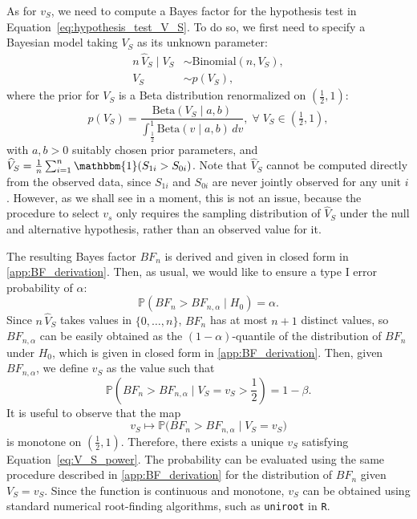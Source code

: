 \documentclass[referee,usenatbib]{biom}
\newcommand{\one}{\mathbbm{1}}
\begin{document}
As for \(v_{S}\), we need to compute a Bayes factor for the hypothesis test in Equation~\eqref{eq:hypothesis_test_V_S}. To do so, we first need to specify a Bayesian model taking \(V_{S}\) as its unknown parameter:
\begin{equation*}
    \begin{aligned}
        n \, \widehat{V}_{S} \mid V_{S} & \sim \text{Binomial}(n, V_{S}), \\
        V_{S} & \sim p(V_{S}),
    \end{aligned}
\end{equation*}
where the prior for \(V_{S}\) is a Beta distribution renormalized on \( \left( \frac{1}{2}, 1 \right)\):
\begin{equation*}
    p(V_{S}) = \frac{\text{Beta}(V_{S} \mid a, b)}{\int_{\frac{1}{2}}^{1} \text{Beta}(v \mid a, b) \, dv}, \; \forall \; V_{S} \in \left(\tfrac{1}{2}, 1\right),
\end{equation*}
with \(a, b > 0\) suitably chosen prior parameters, and \(\widehat{V}_{S} = \frac{1}{n} \sum_{i=1}^{n} \one(S_{1i} > S_{0i})\). Note that \(\widehat{V}_{S}\) cannot be computed directly from the observed data, since \(S_{1i}\) and \(S_{0i}\) are never jointly observed for any unit \(i\). However, as we shall see in a moment, this is not an issue, because the procedure to select \(v_{s}\) only requires the sampling distribution of \(\widehat{V}_{S}\) under the null and alternative hypothesis, rather than an observed value for it.

The resulting Bayes factor \(BF_n\) is derived and given in closed form in \ref{app:BF_derivation}. Then, as usual, we would like to ensure a type I error probability of \(\alpha\):
\begin{equation*}
    \mathbb{P} (BF_{n} > BF_{n, \alpha} \mid H_0) = \alpha.
\end{equation*}
Since \(n \, \widehat{V}_{S}\) takes values in \(\{0, \ldots, n\}\), \(BF_{n}\) has at most \(n + 1\) distinct values, so \(BF_{n, \alpha}\) can be easily obtained as the \((1 - \alpha)\)-quantile of the distribution of \(BF_{n}\) under \(H_0\), which is given in closed form in \ref{app:BF_derivation}. Then, given \(BF_{n, \alpha}\), we define \(v_{S}\) as the value such that
\begin{equation}
\label{eq:V_S_power}
    \mathbb{P} \left( BF_{n} > BF_{n, \alpha} \mid V_{S} = v_{S} > \frac{1}{2} \right) = 1 - \beta.
\end{equation}
It is useful to observe that the map
\begin{equation*}
v_{S} \mapsto \mathbb{P} \big( BF_{n} > BF_{n, \alpha} \mid V_S = v_{S} \big)
\end{equation*}
is monotone on \(\left(\frac{1}{2}, 1\right)\). Therefore, there exists a unique \(v_{S}\) satisfying Equation~\eqref{eq:V_S_power}. The probability can be evaluated using the same procedure described in \ref{app:BF_derivation} for the distribution of \(BF_{n}\) given \(V_S = v_{S}\). Since the function is continuous and monotone, \(v_{S}\) can be obtained using standard numerical root-finding algorithms, such as \texttt{uniroot} in \texttt{R}.
\end{document}
